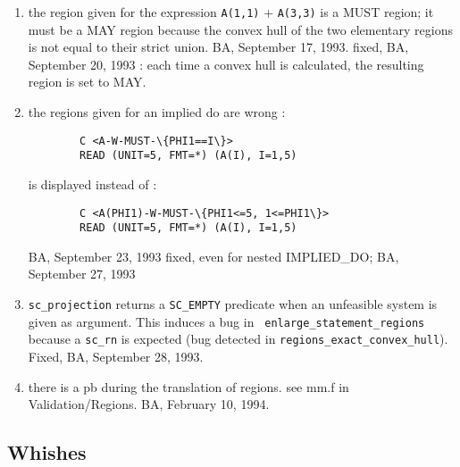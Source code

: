 \begin{enumerate}
  \item the region given for the expression 
                \verb+A(1,1)+ + \verb+A(3,3)+ 
        is a MUST region; it must be a MAY region because the convex
        hull of the two elementary regions is not equal to their strict
        union. BA, September 17, 1993.
        fixed, BA, September 20, 1993 : each time a convex hull is
        calculated, the resulting region is set to MAY. 

  \item the regions given for an implied do are wrong :
        \begin{verbatim}
        C <A-W-MUST-\{PHI1==I\}>
        READ (UNIT=5, FMT=*) (A(I), I=1,5)
        \end{verbatim}
        is displayed instead of :
        \begin{verbatim}
        C <A(PHI1)-W-MUST-\{PHI1<=5, 1<=PHI1\}>
        READ (UNIT=5, FMT=*) (A(I), I=1,5)
        \end{verbatim}
        BA, September 23, 1993
        fixed, even for nested IMPLIED\_DO; BA, September 27, 1993

      \item {\tt sc\_projection} returns a {\tt SC\_EMPTY} predicate when an
        unfeasible system is given as argument. This induces a bug in {\tt
        enlarge\_statement\_regions} because a {\tt sc\_rn} is expected (bug
        detected in {\tt regions\_exact\_convex\_hull}).  Fixed, BA,
        September 28, 1993.

  \item there is a pb during the translation of regions. see mm.f in
        Validation/Regions. BA, February 10, 1994.


\end{enumerate}

\subsection{Whishes}

